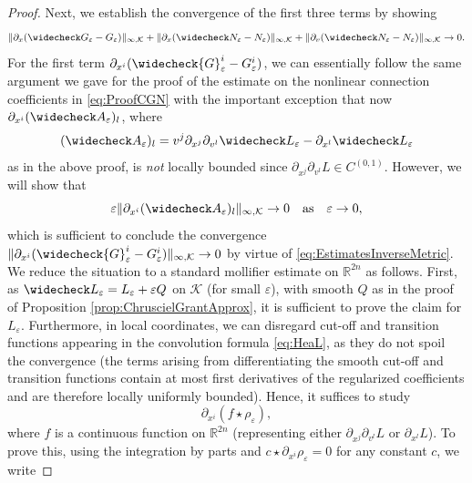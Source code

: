 \documentclass[a4paper,11pt]{article}
\numberwithin{equation}{section}
\theoremstyle{definition}
\theoremstyle{plain}
\newcommand{\R}{\mathbb R}
\newcommand{\eps}{\varepsilon}
\begin{document}
\begin{proof}
Next, we establish the convergence of the first three terms by showing
\begin{equation}
\label{eq:GNN}
    \|\partial_x(\widecheck G_\eps-G_\eps)\|_{\infty,\mathcal{K}}
    +
    \|\partial_x(\widecheck N_\eps-N_\eps)\|_{\infty,\mathcal{K}}
    +
    \|\partial_v(\widecheck N_\eps-N_\eps)\|_{\infty,\mathcal{K}}
    \rightarrow 0.
\end{equation}
For the first term $\partial_{x^i} (\widecheck{G}^{i}_\eps - G^{i}_\eps)$, we can essentially follow the same argument we gave for the proof of the estimate on the nonlinear connection coefficients in \eqref{eq:ProofCGN} with the important exception that now $\partial_{x^i} (\widecheck A_\eps)_l$, where 
\begin{equation*}
    (\widecheck A_\eps)_l= v^j \partial_{x^j} \partial_{v^l} \widecheck L_\eps - \partial_{x^l} \widecheck L_\eps
\end{equation*}
as in the above proof, is \emph{not} locally bounded since $\partial_{x^j} \partial_{v^l} L \in C^{(0,1)}$. 
However, we will show that
\begin{equation}\label{eq:eAto0}
    \eps \|\partial_{x^i} (\widecheck A_\eps)_l\|_{\infty, \mathcal{K}} \rightarrow 0 \quad \textnormal{as} \quad \eps \rightarrow 0,
\end{equation}
which is sufficient to conclude the convergence $\|\partial_{x^i}(\widecheck{G}_\eps^{i} - G_\eps^{i})\|_{\infty,\mathcal{K}} \to 0$ by virtue of \eqref{eq:EstimatesInverseMetric}. 
We reduce the situation to a standard mollifier estimate on $\R^{2n}$ as follows. 
First, as $\widecheck L_\eps = L_\eps + \eps Q$ on $\mathcal{K}$ (for small $\eps$), with smooth $Q$ as in the proof of Proposition \ref{prop:ChruscielGrantApprox}, it is sufficient to prove the claim for $L_\eps$.
Furthermore, in local coordinates, we can disregard cut-off and transition functions appearing in the convolution formula \eqref{eq:HeaL}, as they do not spoil the convergence (the terms arising from differentiating the smooth cut-off and transition functions contain at most first derivatives of the regularized coefficients and are therefore locally uniformly bounded). 
Hence, it suffices to study
\begin{equation}\label{eq: ProofRicReduction}
    \partial_{x^i}(f \star \rho_\eps),
\end{equation}
where $f$ is a continuous function on $\R^{2n}$ (representing either $\partial_{x^j} \partial_{v^l} L$ or $\partial_{x^l} L$). 
To prove this, using the integration by parts and $c \star \partial_{x^i}\rho_\eps=0$ for any constant $c$, we write

\end{proof}
\end{document}
